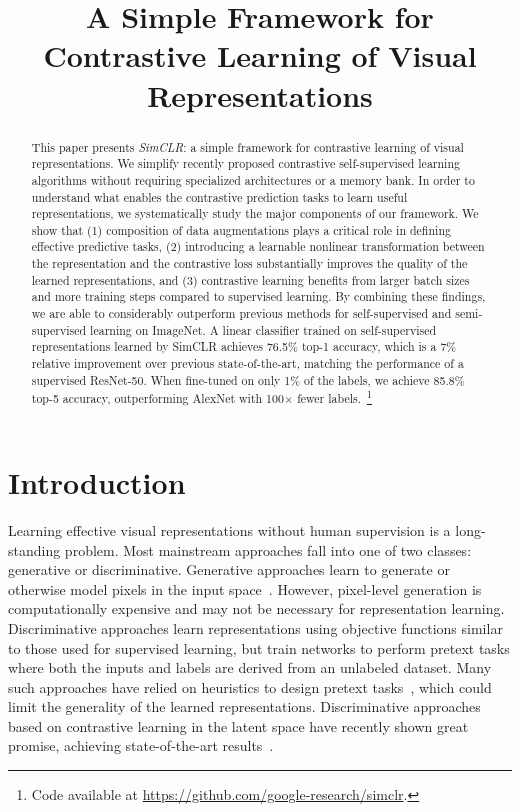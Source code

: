\title{A Simple Framework for Contrastive Learning of Visual Representations}

\begin{abstract}
This paper presents \textit{SimCLR}: a simple framework for contrastive learning of visual representations. We simplify recently proposed contrastive self-supervised learning algorithms without requiring specialized architectures or a memory bank. In order to understand what enables the contrastive prediction tasks to learn useful representations, we systematically study the major components of our framework. We show that (1) composition of data augmentations plays a critical role in defining effective predictive tasks, (2) introducing a learnable nonlinear transformation between the representation and the contrastive loss substantially improves the quality of the learned representations, and (3) contrastive learning benefits from larger batch sizes and more training steps compared to supervised learning. By combining these findings, we are able to considerably outperform previous methods for self-supervised and semi-supervised learning on ImageNet. A linear classifier trained on self-supervised representations learned by SimCLR achieves 76.5\% top-1 accuracy, which is a 7\% relative improvement over previous state-of-the-art, matching the performance of a supervised ResNet-50. When fine-tuned on only 1\% of the labels, we achieve 85.8\% top-5 accuracy, outperforming AlexNet with 100$\times$ fewer labels.~\footnote{Code available at \href{https://github.com/google-research/simclr}{https://github.com/google-research/simclr}.}
\end{abstract}

\section{Introduction}
Learning effective visual representations without human supervision is a long-standing problem. Most mainstream approaches fall into one of two classes: generative or discriminative. Generative approaches learn to generate or otherwise model pixels in the input space~\cite{hinton2006fast,kingma2013auto,goodfellow2014generative}. However, pixel-level generation is computationally expensive and may not be necessary for representation learning. \linebreak Discriminative approaches learn representations using objective functions similar to those used for supervised learning, but train networks to perform pretext tasks where both the inputs and labels are derived from an unlabeled dataset. Many such approaches have relied on heuristics to design pretext tasks~\cite{doersch2015unsupervised,zhang2016colorful,noroozi2016unsupervised,gidaris2018unsupervised}, which could limit the generality of the learned representations. Discriminative approaches based on contrastive learning in the latent space have recently shown great promise, achieving state-of-the-art results~\cite{hadsell2006dimensionality,dosovitskiy2014discriminative,oord2018representation,bachman2019learning}.

